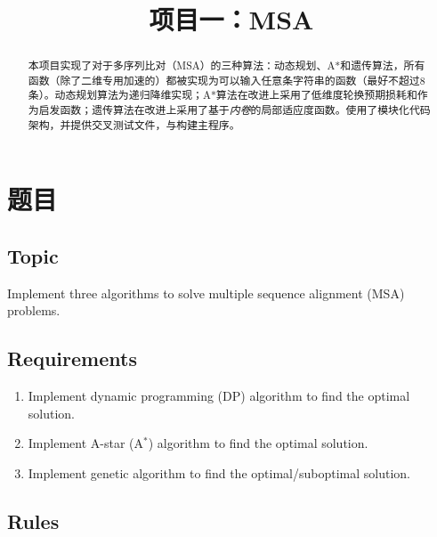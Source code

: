 \endofdump
{}

    \title{项目一：MSA}
    \maketitle

    \begin{abstract}
        本项目实现了对于多序列比对（MSA）的三种算法：动态规划、A*和遗传算法，所有函数（除了二维专用加速的）都被实现为可以输入任意条字符串的函数（最好不超过8条）。动态规划算法为递归降维实现；A*算法在改进上采用了低维度轮换预期损耗和作为启发函数；遗传算法在改进上采用了基于\emph{内卷}的局部适应度函数。使用了模块化代码架构，并提供交叉测试文件，与构建主程序。
    \end{abstract}

    \tableofcontents

    \clearpage

    \section{题目}

    \subsection{Topic}

    Implement three algorithms to solve multiple sequence alignment (MSA) problems.

    \subsection{Requirements}

    \begin{enumerate}
        \item Implement dynamic programming (DP) algorithm to find the optimal solution.
        \item Implement A-star (A$^\ast$) algorithm to find the optimal solution.
        \item Implement genetic algorithm to find the optimal/suboptimal solution.
    \end{enumerate}

    \subsection{Rules}

